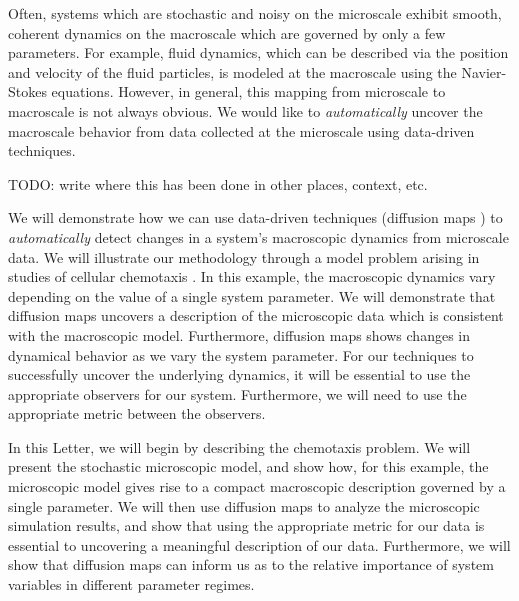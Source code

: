 \documentclass[prl, reprint, final, showkeys]{revtex4-1}
\begin{document}

\maketitle

 
Often, systems which are stochastic and noisy on the microscale exhibit smooth, coherent dynamics on the macroscale which are governed by only a few parameters.
%
For example, fluid dynamics, which can be described via the position and velocity of the fluid particles, is modeled at the macroscale using the Navier-Stokes equations.
%
However, in general, this mapping from microscale to macroscale is not always obvious.
%
We would like to {\em automatically} uncover the macroscale behavior from data collected at the microscale using data-driven techniques.

TODO: write where this has been done in other places, context, etc.

We will demonstrate how we can use data-driven techniques (diffusion maps \cite{coifman2005geometric}) to {\em automatically} detect changes in a system's macroscopic dynamics from microscale data.
%
We will illustrate our methodology through a model problem arising in studies of cellular chemotaxis \cite{othmer2000diffusion}.
%
In this example, the macroscopic dynamics vary depending on the value of a single system parameter.
%
We will demonstrate that diffusion maps uncovers a description of the microscopic data which is consistent with the macroscopic model.
%
Furthermore, diffusion maps shows changes in dynamical behavior as we vary the system parameter. 
%
For our techniques to successfully uncover the underlying dynamics, it will be essential to use the appropriate observers for our system.
%
Furthermore, we will need to use the appropriate metric between the observers.

In this Letter, we will begin by describing the chemotaxis problem.
%
We will present the stochastic microscopic model, and show how, for this example, the microscopic model gives rise to a compact macroscopic description governed by a single parameter.
%
We will then use diffusion maps to analyze the microscopic simulation results, and show that using the appropriate metric for our data is essential to uncovering a meaningful description of our data.
%
Furthermore, we will show that diffusion maps can inform us as to the relative importance of system variables in different parameter regimes.
\end{document}
